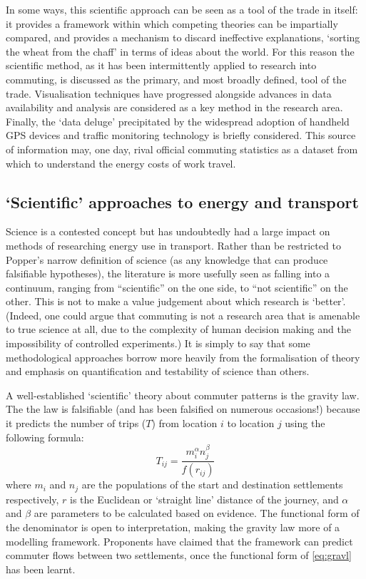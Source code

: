 In some ways, this scientific approach
can be seen as a tool of the trade in itself: it provides a framework within
which competing theories can be impartially compared, and provides a mechanism
to discard ineffective explanations, `sorting the wheat from the chaff' in terms of
ideas about the world. For this reason the scientific method, as it has been
intermittently applied to research into commuting, is discussed as the primary,
and most broadly defined, tool of the trade.
Visualisation techniques have progressed alongside advances in data availability
and analysis are considered as a key method in the research area.
Finally, the `data deluge' precipitated by the
widespread adoption of handheld GPS devices and traffic monitoring technology
is briefly considered. This source of information may, one day,
rival official commuting statistics as a dataset from which to understand the
energy costs of work travel.

\subsection{`Scientific' approaches to energy and transport}
Science is a contested concept but has undoubtedly had a large impact on
methods of researching energy use in transport. Rather than be restricted
to Popper's narrow definition of science (as any knowledge that can produce
falsifiable hypotheses), the literature is more usefully seen as falling into a continuum,
ranging from ``scientific'' on the one side, to ``not scientific'' on the
other. This is not to make a value judgement about which research is `better'.
(Indeed, one could argue that commuting is not a research area
that is amenable to true science at all, due to the complexity of human decision
making and the impossibility of controlled experiments.) It is simply
to say that some methodological approaches borrow more heavily from the
formalisation of theory and emphasis on quantification and testability of
science than others. 

A well-established `scientific' theory about commuter patterns is the gravity
law. The the law is falsifiable (and has been falsified on numerous occasions!)
because it predicts the number of trips ($T$) from location $i$ to location $j$
using the following formula:
\begin{equation}
 T_{ij} = \frac{m_{i}^{\alpha} n_{j} ^{\beta}} {f(r_{ij})}
\label{eq:gravl}
\end{equation}
where  $m_i$ and $n_j$ are the populations of the start and
destination settlements respectively, $r$ is the Euclidean or `straight line'
distance of the
journey, and $\alpha$ and $\beta$ are parameters to be calculated based on
evidence. The functional form of the denominator is open to interpretation,
making the gravity law more of a modelling framework. Proponents have
claimed that the
framework can predict commuter flows between two settlements, once the
functional form of \cref{eq:gravl} has been learnt.

